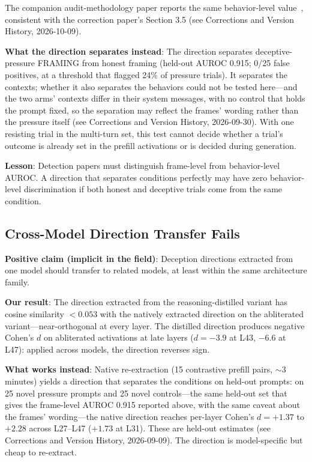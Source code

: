 \documentclass[11pt,letterpaper]{article}
\begin{document}
The companion audit-methodology paper reports the same behavior-level value~\cite{cc2026audit},
consistent with the correction paper's Section 3.5 (see Corrections and Version History,
2026-10-09).

\textbf{What the direction separates instead}: The direction separates deceptive-pressure FRAMING from
honest framing (held-out AUROC 0.915; 0/25 false positives, at a threshold that flagged 24\% of pressure trials). It separates the contexts; whether it also separates the behaviors could not be tested here---and the two arms' contexts differ in their system messages, with no control that holds the prompt fixed, so the separation may reflect the frames' wording rather than the pressure itself (see Corrections and Version History, 2026-09-30). With
one resisting trial in the multi-turn set, this test cannot decide whether a trial's outcome is
already set in the prefill activations or is decided during generation.

\textbf{Lesson}: Detection papers must distinguish frame-level from behavior-level AUROC. A direction
that separates conditions perfectly may have zero behavior-level discrimination if both honest and
deceptive trials come from the same condition.

\subsection{Cross-Model Direction Transfer Fails}\label{sec:crossmodel}

\textbf{Positive claim (implicit in the field)}: Deception directions extracted from one model
should transfer to related models, at least within the same architecture family.

\textbf{Our result}: The direction extracted from the reasoning-distilled variant has cosine
similarity $< 0.053$ with the natively extracted direction on the abliterated variant---near-orthogonal
at every layer. The distilled direction produces negative Cohen's $d$ on abliterated activations at
late layers ($d = -3.9$ at L43, $-6.6$ at L47): applied across models, the direction reverses sign.

\textbf{What works instead}: Native re-extraction (15 contrastive prefill pairs, $\sim$3 minutes)
yields a direction that separates the conditions on held-out prompts: on 25 novel pressure prompts
and 25 novel controls---the same held-out set that gives the frame-level AUROC 0.915 reported
above, with the same caveat about the frames' wording---the native direction reaches per-layer
Cohen's $d = +1.37$ to $+2.28$ across L27--L47 ($+1.73$ at L31). These are held-out estimates (see
Corrections and Version History, 2026-09-09). The direction is model-specific but cheap to
re-extract.
\end{document}
